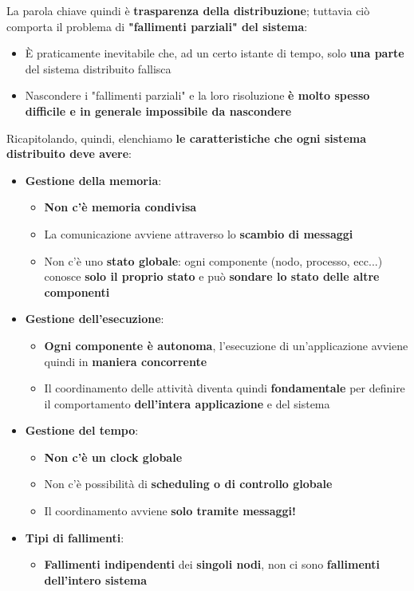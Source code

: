\documentclass[12pt]{article}
\begin{document}
La parola chiave quindi è \textbf{trasparenza della distribuzione}; tuttavia ciò comporta il problema di \textbf{"fallimenti parziali" del sistema}:
\begin{itemize}
    \item È praticamente inevitabile che, ad un certo istante di tempo, solo \textbf{una parte} del sistema distribuito fallisca
    \item Nascondere i "fallimenti parziali" e la loro risoluzione \textbf{è molto spesso difficile e in generale impossibile da nascondere}
\end{itemize}
Ricapitolando, quindi, elenchiamo \textbf{le caratteristiche che ogni sistema distribuito deve avere}:
\begin{itemize}
    \item \textbf{Gestione della memoria}:
          \begin{itemize}
              \item \textbf{Non c'è memoria condivisa}
              \item La comunicazione avviene attraverso lo \textbf{scambio di messaggi}
              \item Non c'è uno \textbf{stato globale}: ogni componente (nodo, processo, ecc...) conosce \textbf{solo il proprio stato} e può \textbf{sondare lo stato delle altre componenti}
          \end{itemize}
    \item \textbf{Gestione dell'esecuzione}:
          \begin{itemize}
              \item \textbf{Ogni componente è autonoma}, l'esecuzione di un'applicazione avviene quindi in \textbf{maniera concorrente}
              \item Il coordinamento delle attività diventa quindi \textbf{fondamentale} per definire il comportamento \textbf{dell'intera applicazione} e del sistema
          \end{itemize}
    \item \textbf{Gestione del tempo}:
          \begin{itemize}
              \item \textbf{Non c'è un clock globale}
              \item Non c'è possibilità di \textbf{scheduling o di controllo globale}
              \item Il coordinamento avviene \textbf{solo tramite messaggi!}
          \end{itemize}
    \item \textbf{Tipi di fallimenti}:
          \begin{itemize}
              \item \textbf{Fallimenti indipendenti} dei \textbf{singoli nodi}, non ci sono \textbf{fallimenti dell'intero sistema}
          \end{itemize}
\end{itemize}
\end{document}
